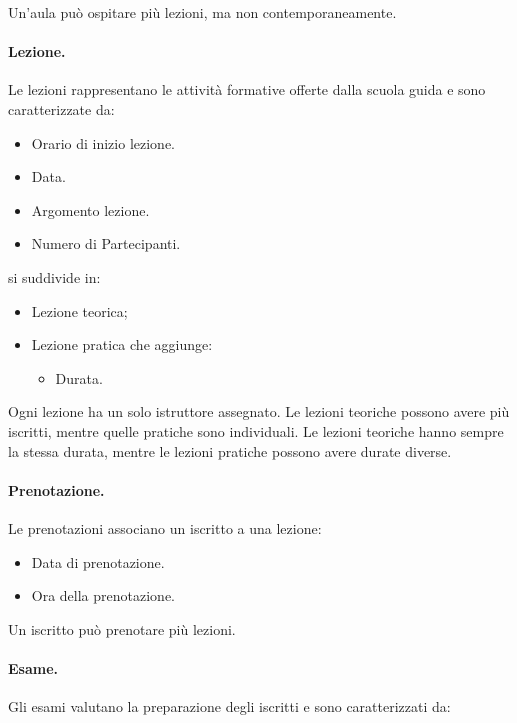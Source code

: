 \documentclass[10pt,twoside]{article}
\begin{document}
{    Un’aula può ospitare più lezioni, ma non contemporaneamente.
    

    \paragraph{Lezione.}
    Le lezioni rappresentano le attività formative offerte dalla scuola guida e sono caratterizzate da: 
    
    \begin{itemize}
        \item Orario di inizio lezione.
        \item Data.
        \item Argomento lezione.
        \item Numero di Partecipanti. 
    \end{itemize}
    
    si suddivide in:

    \begin{itemize}
        \item Lezione teorica;
        \item Lezione pratica che aggiunge:
        \begin{itemize}
            \item Durata.
        \end{itemize}
    \end{itemize}

    Ogni lezione ha un solo istruttore assegnato. Le lezioni teoriche possono avere più iscritti, mentre quelle pratiche sono individuali. Le lezioni teoriche hanno sempre la stessa durata, mentre le lezioni pratiche possono avere durate diverse.
    

    \paragraph{Prenotazione.}
    Le prenotazioni associano un iscritto a una lezione:

    \begin{itemize}
        \item Data di prenotazione. 
        \item Ora della prenotazione.
    \end{itemize}

    Un iscritto può prenotare più lezioni.
    

    \paragraph{Esame.}
    Gli esami valutano la preparazione degli iscritti e sono caratterizzati da:

}
\end{document}
